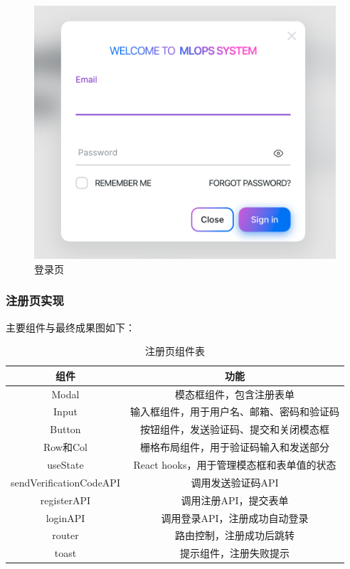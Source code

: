 \documentclass{HDU-Bachelor-Thesis}
\begin{document}
\begin{figure}[H] %
\centering %
\includegraphics[width=1\textwidth]{P-3.png} %
\caption{登录页} %
\label{图片.login} %
\end{figure}

\subsubsection{注册页实现}

主要组件与最终成果图如下：

\begin{table}[htbp] 
\caption{注册页组件表}   
\label{table:register}
\centering
\begin{tabular}{c|c}
\hline
\textbf{组件} & \textbf{功能}\\ 
\hline
Modal & 模态框组件，包含注册表单\\
\hline
Input & 输入框组件，用于用户名、邮箱、密码和验证码\\
\hline  
Button & 按钮组件，发送验证码、提交和关闭模态框\\ 
\hline
Row和Col & 栅格布局组件，用于验证码输入和发送部分\\
\hline
useState & React hooks，用于管理模态框和表单值的状态\\
\hline 
sendVerificationCodeAPI & 调用发送验证码API\\
\hline
registerAPI & 调用注册API，提交表单\\
\hline
loginAPI & 调用登录API，注册成功自动登录\\
\hline
router & 路由控制，注册成功后跳转\\
\hline 
toast & 提示组件，注册失败提示\\
\hline
\end{tabular}
\end{table}
\end{document}
